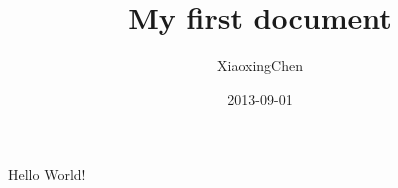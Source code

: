 \documentclass{article}
\title{My first document}
\date{2013-09-01}
\author{XiaoxingChen}
\begin{document}
  \maketitle
  \newpage

  Hello World!

\end{document}
